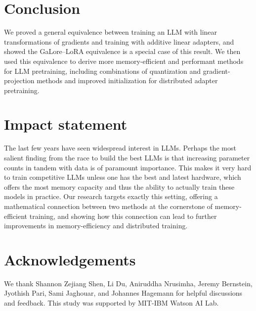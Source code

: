 \vcram{-2mm}
\section{Conclusion}
\vcram{-2mm}
We proved a general equivalence between training an LLM with linear transformations of gradients and training with additive linear adapters, and showed the GaLore--LoRA equivalence is a special case of this result.
We then used this equivalence to derive more memory-efficient and performant methods for LLM pretraining, including combinations of quantization and gradient-projection methods and improved initialization for distributed adapter pretraining.

\section*{Impact statement}
The last few years have seen widespread interest in LLMs.
Perhaps the most salient finding from the race to build the best LLMs is that increasing parameter counts in tandem with data is of paramount importance.
This makes it very hard to train competitive LLMs unless one has the best and latest hardware, which offers the most memory capacity and thus the ability to actually train these models in practice.
Our research targets exactly this setting, offering a mathematical connection between two methods at the cornerstone of memory-efficient training, and showing how this connection can lead to further improvements in memory-efficiency and distributed training. 

\section*{Acknowledgements}
We thank Shannon Zejiang Shen, Li Du, Aniruddha Nrusimha, Jeremy Bernstein, Jyothish Pari, Sami Jaghouar, and Johannes Hagemann for helpful discussions and feedback. This study was supported by MIT-IBM Watson AI Lab.


